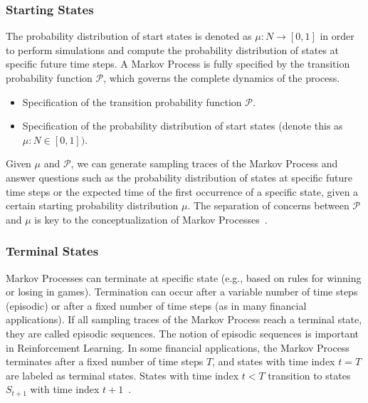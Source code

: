 \documentclass[../xlapes02]{subfiles}
\begin{document}
    \subsubsection{Starting States}
    The probability distribution of start states is denoted as $\mu : N \rightarrow [0,1]$ in order to perform simulations and compute the probability distribution of states at specific future time steps. A Markov Process is fully specified by the transition probability function $\mathcal{P}$, which governs the complete dynamics of the process.
    \begin{itemize}
        \item Specification of the transition probability function $\mathcal{P}$.
        \item Specification of the probability distribution of start states (denote this as $\mu : N \in[0, 1])$.
    \end{itemize}
    Given $\mu$ and $\mathcal{P}$, we can generate sampling traces of the Markov Process and answer questions such as the probability distribution of states at specific future time steps or the expected time of the first occurrence of a specific state, given a certain starting probability distribution $\mu$. The separation of concerns between $\mathcal{P}$ and $\mu$ is key to the conceptualization of Markov Processes~\cite{rao2022foundations}.

    \subsubsection{Terminal States}
    Markov Processes can terminate at specific state (e.g., based on rules for winning or losing in games). Termination can occur after a variable number of time steps (episodic) or after a fixed number of time steps (as in many financial applications). If all sampling traces of the Markov Process reach a terminal state, they are called episodic sequences. The notion of episodic sequences is important in Reinforcement Learning. In some financial applications, the Markov Process terminates after a fixed number of time steps $T$, and states with time index $t = T$ are labeled as terminal states. States with time index $t < T$ transition to states $S_{t+1}$ with time index $t + 1$~\cite{rao2022foundations}.
\end{document}
